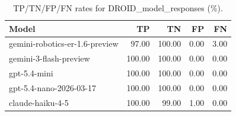 \begin{table}
\caption{TP/TN/FP/FN rates for DROID_model_responses (\%).}
\label{tab:droid_model_responses_model_rates}
\begin{tabular}{lrrrr}
\toprule
Model & TP & TN & FP & FN \\
\midrule
gemini-robotics-er-1.6-preview & 97.00 & 100.00 & 0.00 & 3.00 \\
gemini-3-flash-preview & 100.00 & 100.00 & 0.00 & 0.00 \\
gpt-5.4-mini & 100.00 & 100.00 & 0.00 & 0.00 \\
gpt-5.4-nano-2026-03-17 & 100.00 & 100.00 & 0.00 & 0.00 \\
claude-haiku-4-5 & 100.00 & 99.00 & 1.00 & 0.00 \\
\bottomrule
\end{tabular}
\end{table}
